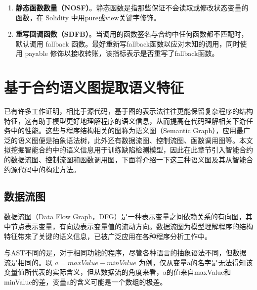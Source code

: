 \begin{enumerate}[label=\Alph*., align=left, leftmargin=*]
    \item \textbf{静态函数数量（NOSF）}。静态函数是指那些保证不会读取或修改状态变量的函数，在 Solidity 中用pure或view关键字修饰。
    \item \textbf{重写回调函数（SDFB）}。当调用的函数签名与合约中任何函数都不匹配时，默认调用 fallback 函数。最好重新写fallback函数以应对未知的调用，同时使用 payable 修饰以接收转账，该指标表示是否重写了fallback函数。
\end{enumerate}

\section{基于合约语义图提取语义特征}
\label{sec:基于合约语义图提取语义特征}

已有许多工作证明，相比于源代码，基于图的表示法往往更能保留复杂程序的结构特征\cite{allamanis2017learning}，这有助于模型更好地理解程序的语义信息，从而提高在代码理解相关下游任务中的性能。这些与程序结构相关的图称为语义图（Semantic Graph），应用最广泛的语义图便是抽象语法树，此外还有数据流图、控制流图、函数调用图等。本文拟挖掘智能合约中的语义信息用于训练缺陷检测模型，因此在此章节引入智能合约的数据流图、控制流图和函数调用图，下面将介绍一下这三种语义图及其从智能合约源代码中的构建方法。

\subsection{数据流图}
\label{sec:数据流图}
数据流图（Data Flow Graph，DFG）是一种表示变量之间依赖关系的有向图，其中节点表示变量，有向边表示变量值的流动方向。数据流图为模型理解程序的结构特征带来了关键的语义信息，已被广泛应用在各种程序分析工作中\cite{hellendoorn2019global,allamanis2018learning,guo2020graphcodebert}。

与AST不同的是，对于相同功能的程序，尽管各种语言的抽象语法不同，但数据流是相同的。以 $a=maxValue-minValue$ 为例，仅从变量a的名字是无法得知该变量值所代表的实际含义，但从数据流的角度来看，a的值来自maxValue和minValue的差，变量a的含义可能是一个数组的极差。

